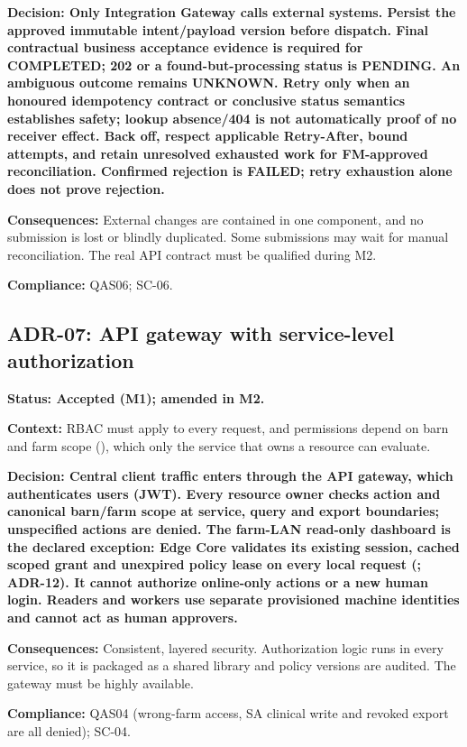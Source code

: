 \textbf{Decision: Only Integration Gateway calls external systems.
Persist the approved immutable intent/payload version before dispatch.
Final contractual business acceptance evidence is required for
COMPLETED; 202 or a found-but-processing status is PENDING. An ambiguous
outcome remains UNKNOWN. Retry only when an honoured idempotency
contract or conclusive status semantics establishes safety; lookup
absence/404 is not automatically proof of no receiver effect. Back off,
respect applicable Retry-After, bound attempts, and retain unresolved
exhausted work for FM-approved reconciliation. Confirmed rejection is
FAILED; retry exhaustion alone does not prove rejection.}

\textbf{Consequences:} External changes are contained in one component,
and no submission is lost or blindly duplicated. Some submissions may
wait for manual reconciliation. The real API contract must be qualified
during M2.

\textbf{Compliance:} QAS06; SC-06.

\subsection{ADR-07: API gateway with service-level authorization}\label{adr:07}

\textbf{Status: Accepted (M1); amended in M2.}

\textbf{Context:} RBAC must apply to every request, and permissions
depend on barn and farm scope (), which only the service
that owns a resource can evaluate.

\textbf{Decision: Central client traffic enters through the API gateway,
which authenticates users (JWT). Every resource owner checks action and
canonical barn/farm scope at service, query and export boundaries;
unspecified actions are denied. The farm-LAN read-only dashboard is the
declared exception: Edge Core validates its existing session, cached
scoped grant and unexpired policy lease on every local request (; ADR-12). It cannot authorize online-only actions or a new human
login. Readers and workers use separate provisioned machine identities
and cannot act as human approvers.}

\textbf{Consequences:} Consistent, layered security. Authorization logic
runs in every service, so it is packaged as a shared library and policy
versions are audited. The gateway must be highly available.

\textbf{Compliance:} QAS04 (wrong-farm access, SA clinical write and
revoked export are all denied); SC-04.

